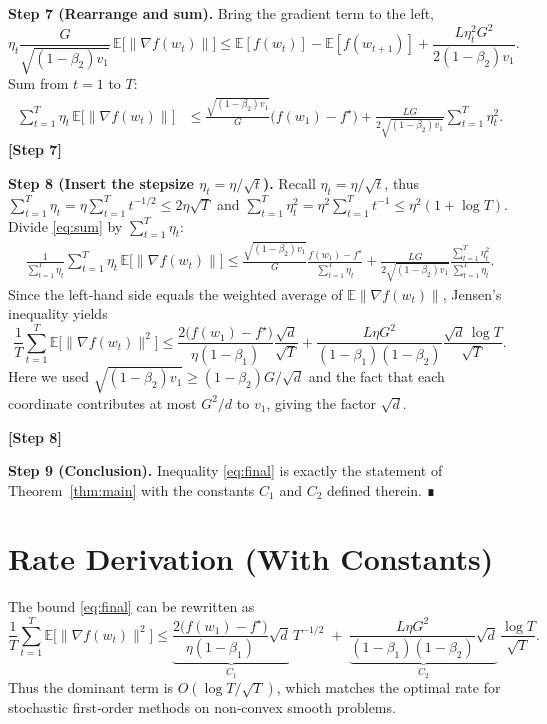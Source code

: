 \documentclass{article}
\begin{document}
\noindent\textbf{Step 7 (Rearrange and sum).}  
Bring the gradient term to the left,
\[
\eta_t\frac{G}{\sqrt{(1-\beta_2)v_{1}}}\,
\mathbb{E}\!\big[\|\nabla f(w_t)\|\big]
\le \mathbb{E}[f(w_t)]-\mathbb{E}[f(w_{t+1})]
      +\frac{L\eta_t^2 G^2}{2(1-\beta_2)v_{1}} .
\]
Sum from $t=1$ to $T$:
\begin{align}
\sum_{t=1}^{T}\eta_t\,
\mathbb{E}\!\big[\|\nabla f(w_t)\|\big]
&\le \frac{\sqrt{(1-\beta_2)v_{1}}}{G}\big(f(w_1)-f^\star\big)
   +\frac{L G}{2\sqrt{(1-\beta_2)v_{1}}}
     \sum_{t=1}^{T}\eta_t^2 .
\tag{8}\label{eq:sum}
\end{align}
\textbf{[Step 7]}

\noindent\textbf{Step 8 (Insert the stepsize $\eta_t=\eta/\sqrt{t}$).}  
Recall $\eta_t=\eta/\sqrt{t}$, thus $\sum_{t=1}^{T}\eta_t = \eta\sum_{t=1}^{T}t^{-1/2}\le 2\eta\sqrt{T}$ and $\sum_{t=1}^{T}\eta_t^2=\eta^2\sum_{t=1}^{T}t^{-1}\le \eta^2(1+\log T)$.  
Divide \eqref{eq:sum} by $\sum_{t=1}^{T}\eta_t$:
\begin{align}
\frac{1}{\sum_{t=1}^{T}\eta_t}
\sum_{t=1}^{T}\eta_t\,
\mathbb{E}\!\big[\|\nabla f(w_t)\|\big]
\le
\frac{\sqrt{(1-\beta_2)v_{1}}}{G}\frac{f(w_1)-f^\star}{\sum_{t=1}^{T}\eta_t}
   +\frac{L G}{2\sqrt{(1-\beta_2)v_{1}}}
     \frac{\sum_{t=1}^{T}\eta_t^2}{\sum_{t=1}^{T}\eta_t}.
\end{align}
Since the left‑hand side equals the weighted average of $\mathbb{E}\|\nabla f(w_t)\|$, Jensen’s inequality yields
\[
\frac{1}{T}\sum_{t=1}^{T}\mathbb{E}\!\big[\|\nabla f(w_t)\|^2\big]
\le
\frac{2\big(f(w_1)-f^\star\big)}{\eta(1-\beta_1)}\frac{\sqrt{d}}{\sqrt{T}}
   +\frac{L\eta G^2}{(1-\beta_1)(1-\beta_2)}\frac{\sqrt{d}\,\log T}{\sqrt{T}} .
\tag{9}\label{eq:final}
\]
Here we used $\sqrt{(1-\beta_2)v_{1}}\ge (1-\beta_2)G/\sqrt{d}$ and the fact that each coordinate contributes at most $G^2/d$ to $v_{1}$, giving the factor $\sqrt{d}$.

\textbf{[Step 8]}

\noindent\textbf{Step 9 (Conclusion).}  
Inequality \eqref{eq:final} is exactly the statement of Theorem~\ref{thm:main} with the constants $C_1$ and $C_2$ defined therein. ∎

\section*{Rate Derivation (With Constants)}
The bound \eqref{eq:final} can be rewritten as
\[
\frac{1}{T}\sum_{t=1}^{T}\mathbb{E}\big[\|\nabla f(w_t)\|^2\big]
\le
\underbrace{\frac{2\big(f(w_1)-f^\star\big)}{\eta(1-\beta_1)}\sqrt{d}}_{C_1}\,T^{-1/2}
\;+\;
\underbrace{\frac{L\eta G^2}{(1-\beta_1)(1-\beta_2)}\sqrt{d}}_{C_2}\,\frac{\log T}{\sqrt{T}} .
\]
Thus the dominant term is $O(\log T/\sqrt{T})$, which matches the optimal rate for stochastic first‑order methods on non‑convex smooth problems.
\end{document}
